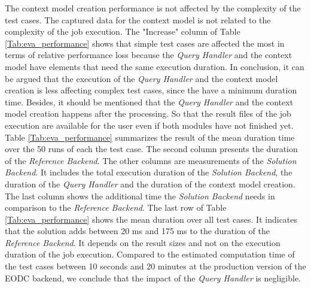 \documentclass[draft,final]{vutinfth} %
\begin{document}
The context model creation performance is not affected by the complexity of the test cases. The captured data for the context model is not related to the complexity of the job execution. The "Increase" column of Table \ref{Tab:eva_performance} shows that simple test cases are affected the most in terms of relative performance loss because the \textit{Query Handler} and the context model have elements that need the same execution duration. In conclusion, it can be argued that the execution of the \textit{Query Handler} and the context model creation is less affecting complex test cases, since the have a minimum duration time. Besides, it should be mentioned that the \textit{Query Handler} and the context model creation happens after the processing. So that the result files of the job execution are available for the user even if both modules have not finished yet. \\
Table \ref{Tab:eva_performance} summarizes the result of the mean duration time over the 50 runs of each the test case. The second column presents the duration of the \textit{Reference Backend}. The other columns are measurements of the \textit{Solution Backend}. It includes the total execution duration of the \textit{Solution Backend}, the duration of the \textit{Query Handler} and the duration of the context model creation. The last column shows the additional time the \textit{Solution Backend} needs in comparison to the \textit{Reference Backend}. The last row of Table \ref{Tab:eva_performance} shows the mean duration over all test cases. It indicates that the solution adds between 20 ms and 175 ms to the duration of the \textit{Reference Backend}. It depends on the result sizes and not on the execution duration of the job execution. Compared to the estimated computation time of the test cases between 10 seconds and 20 minutes at the production version of the EODC backend, we conclude that the impact of the \textit{Query Handler} is negligible.
\end{document}
